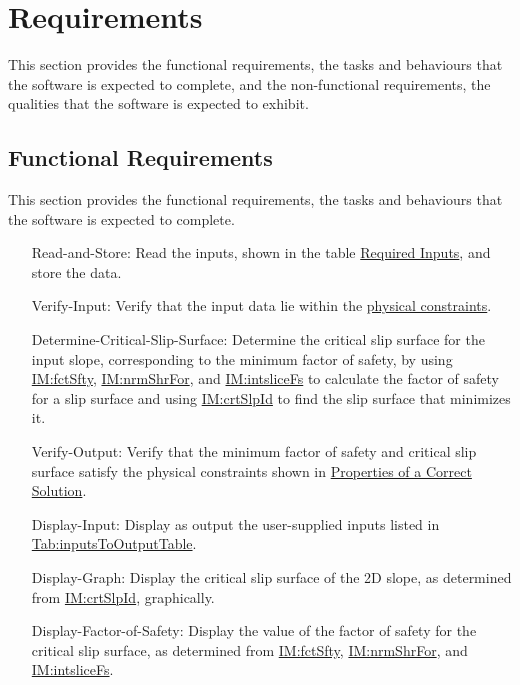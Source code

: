 \documentclass[12pt]{article}
\begin{document}
\section{Requirements}
\label{Sec:Requirements}
This section provides the functional requirements, the tasks and behaviours that the software is expected to complete, and the non-functional requirements, the qualities that the software is expected to exhibit.

\subsection{Functional Requirements}
\label{Sec:FRs}
This section provides the functional requirements, the tasks and behaviours that the software is expected to complete.

\begin{itemize}
\item[Read-and-Store:\phantomsection\label{readAndStore}]{Read the inputs, shown in the table \hyperref[Table:ReqInputs]{Required Inputs}, and store the data.}
\item[Verify-Input:\phantomsection\label{verifyInput}]{Verify that the input data lie within the \hyperref[Sec:DataConstraints]{physical constraints}.}
\item[Determine-Critical-Slip-Surface:\phantomsection\label{determineCritSlip}]{Determine the critical slip surface for the input slope, corresponding to the minimum factor of safety, by using \hyperref[IM:fctSfty]{IM:fctSfty}, \hyperref[IM:nrmShrFor]{IM:nrmShrFor}, and \hyperref[IM:intsliceFs]{IM:intsliceFs} to calculate the factor of safety for a slip surface and using \hyperref[IM:crtSlpId]{IM:crtSlpId} to find the slip surface that minimizes it.}
\item[Verify-Output:\phantomsection\label{verifyOutput}]{Verify that the minimum factor of safety and critical slip surface satisfy the physical constraints shown in \hyperref[Sec:CorSolProps]{Properties of a Correct Solution}.}
\item[Display-Input:\phantomsection\label{displayInput}]{Display as output the user-supplied inputs listed in \hyperref[Table:inputsToOutputTable]{Tab:inputsToOutputTable}.}
\item[Display-Graph:\phantomsection\label{displayGraph}]{Display the critical slip surface of the 2D slope, as determined from \hyperref[IM:crtSlpId]{IM:crtSlpId}, graphically.}
\item[Display-Factor-of-Safety:\phantomsection\label{displayFS}]{Display the value of the factor of safety for the critical slip surface, as determined from \hyperref[IM:fctSfty]{IM:fctSfty}, \hyperref[IM:nrmShrFor]{IM:nrmShrFor}, and \hyperref[IM:intsliceFs]{IM:intsliceFs}.}

\end{itemize}
\end{document}
